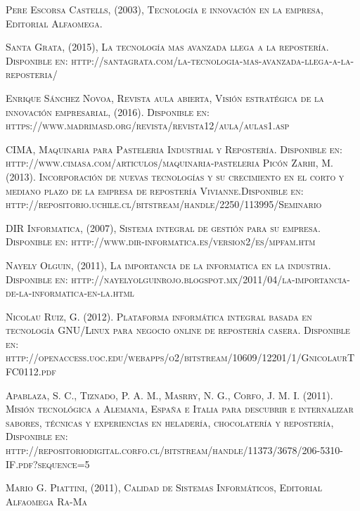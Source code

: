 \documentclass{bmcart}
\begin{document}
\newpage
\renewcommand{\refname}{Referencias}\begin{thebibliography}{X}

 \textsc{Pere Escorsa Castells, (2003), Tecnología e innovación en la empresa, Editorial Alfaomega.}

 \textsc{Santa Grata, (2015), La tecnología mas avanzada llega a la repostería. Disponible en: http://santagrata.com/la-tecnologia-mas-avanzada-llega-a-la-reposteria/ }

 \textsc{Enrique Sánchez Novoa, Revista aula abierta, Visión estratégica de la innovación empresarial, (2016). Disponible en: https://www.madrimasd.org/revista/revista12/aula/aulas1.asp}

 \textsc{CIMA, Maquinaria para Pasteleria Industrial y Repostería. Disponible en: http://www.cimasa.com/articulos/maquinaria-pasteleria}
 \textsc{Picón Zarhi, M. (2013). Incorporación de nuevas tecnologías y su crecimiento en el corto y mediano plazo de la empresa de repostería Vivianne.Disponible en: http://repositorio.uchile.cl/bitstream/handle/2250/113995/Seminario}

 \textsc{DIR Informatica, (2007), Sistema integral de gestión para su empresa. Disponible en: 
http://www.dir-informatica.es/version2/es/mpfam.htm}

 \textsc{Nayely Olguin, (2011), La importancia de la informatica en la industria. Disponible en: http://nayelyolguinrojo.blogspot.mx/2011/04/la-importancia-de-la-informatica-en-la.html}

 \textsc{Nicolau Ruiz, G. (2012). Plataforma informática integral basada en tecnología GNU/Linux para negocio online de repostería casera. Disponible en: http://openaccess.uoc.edu/webapps/o2/bitstream/10609/12201/1/GnicolaurTFC0112.pdf}

 \textsc{Apablaza, S. C., Tiznado, P. A. M., Masrry, N. G., Corfo, J. M. I. (2011). Misión tecnológica a Alemania, España e Italia para descubrir e internalizar sabores, técnicas y experiencias en heladería, chocolatería y repostería, Disponible en: http://repositoriodigital.corfo.cl/bitstream/handle/11373/3678/206-5310-IF.pdf?sequence=5}

 \textsc{Mario G. Piattini, (2011), Calidad de Sistemas Informáticos, Editorial Alfaomega Ra-Ma}


\end{thebibliography}
\end{document}
